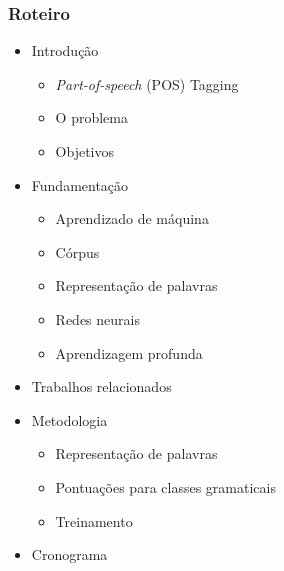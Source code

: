 \documentclass[10pt]{beamer}
\begin{document}
\begin{frame}
  \frametitle{Roteiro}


  \begin{itemize}


    \item Introdução
    
    \begin{itemize}
      \item[\ ] \textit{Part-of-speech} (POS) Tagging 
      \item[\ ] O problema
      \item[\ ] Objetivos
    \end{itemize}


    \color{gray}
    \item[\color{gray}{$\bullet$}] Fundamentação

    \begin{itemize}
      \color{gray}
      \item[\ ] Aprendizado de máquina
      \item[\ ] Córpus
      \item[\ ] Representação de palavras
      \item[\ ] Redes neurais
      \item[\ ] Aprendizagem profunda
    \end{itemize}


    \color{gray}
    \item[\color{gray}{$\bullet$}] Trabalhos relacionados

    \color{gray}
    \item[\color{gray}{$\bullet$}] Metodologia

    \begin{itemize}
      \color{gray}
      \item[\ ] Representação de palavras
      \item[\ ] Pontuações para classes gramaticais
      \item[\ ] Treinamento
    \end{itemize}

    \color{gray}
    \item[\color{gray}{$\bullet$}] Cronograma

  \end{itemize}

\end{frame}
\end{document}
